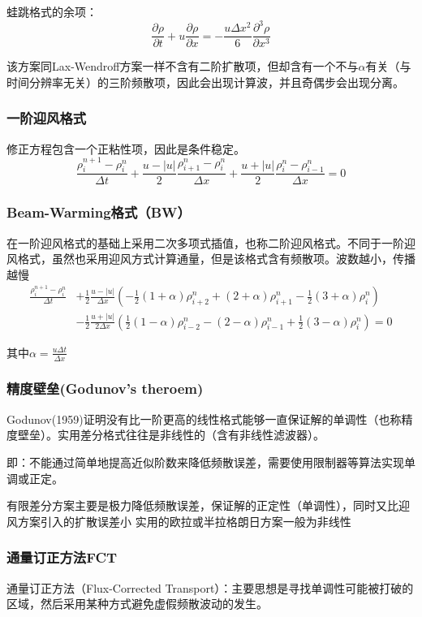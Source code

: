 \documentclass{article}
\begin{document}
蛙跳格式的余项：
$$\frac{\partial \rho }{\partial t} + u\frac{\partial \rho }{\partial x} = 
-\frac{u\Delta x^2}{6}\frac{\partial^3 \rho}{\partial x^3}$$

该方案同Lax-Wendroff方案一样不含有二阶扩散项，但却含有一个不与$\alpha$有关（与时间分辨率无关）的三阶频散项，因此会出现计算波，并且奇偶步会出现分离。

\subsubsection{一阶迎风格式}
修正方程包含一个正粘性项，因此是条件稳定。
$$\frac{\rho^{n+1}_{i}-\rho^{n}_{i}}{\Delta t} + \frac{u - |u|}{2} \frac{\rho^{n}_{i+1} - \rho^{n}_{i}}{\Delta x} + \frac{u + |u|}{2} \frac{\rho^{n}_{i} - \rho^{n}_{i-1}}{\Delta x}= 0$$


\subsubsection{Beam-Warming格式（BW）}
在一阶迎风格式的基础上采用二次多项式插值，也称二阶迎风格式。不同于一阶迎风格式，虽然也采用迎风方式计算通量，但是该格式含有频散项。波数越小，传播越慢
\begin{align}
    \frac{\rho^{n+1}_{i}-\rho^{n}_{i}}{\Delta t} &+ \frac{1}{2}\frac{u - |u|}{\Delta x} \left(-\frac{1}{2} (1 + \alpha) \rho^{n}_{i+2} + (2 + \alpha) \rho^{n}_{i+1} - \frac{1}{2} (3 + \alpha) \rho^{n}_{i} \right) \\
    &- \frac{1}{2} \frac{u + |u|}{2 \Delta x} \left(\frac{1}{2} (1-\alpha) \rho^{n}_{i-2} - (2-\alpha) \rho^{n}_{i-1} + \frac{1}{2} (3-\alpha) \rho^{n}_{i} \right)= 0
\end{align}

其中$\alpha = \frac{u\Delta t}{\Delta x}$


\subsubsection{精度壁垒(Godunov's theroem)}
Godunov(1959)证明没有比一阶更高的线性格式能够一直保证解的单调性（也称精度壁垒）。实用差分格式往往是非线性的（含有非线性滤波器）。

即：不能通过简单地提高近似阶数来降低频散误差，需要使用限制器等算法实现单调或正定。

有限差分方案主要是极力降低频散误差，保证解的正定性（单调性），同时又比迎风方案引入的扩散误差小
实用的欧拉或半拉格朗日方案一般为非线性


\subsubsection{通量订正方法FCT}
通量订正方法（Flux-Corrected Transport）：主要思想是寻找单调性可能被打破的区域，然后采用某种方式避免虚假频散波动的发生。
\end{document}
